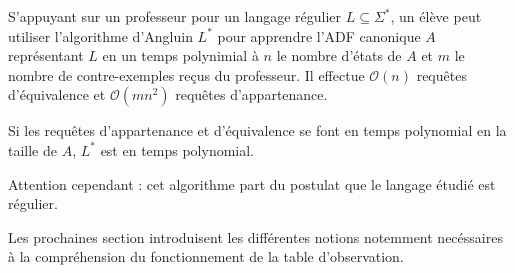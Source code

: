 \begin{theorem}
	S'appuyant sur un professeur pour un langage régulier $L\subseteq\Sigma^*$, un élève peut utiliser l'algorithme d'Angluin $L^*$ pour apprendre l'ADF canonique $A$ représentant $L$ en un temps polynimial à $n$ le nombre d'états de $A$ et $m$ le nombre de contre-exemples reçus du professeur.
	Il effectue $\mathcal{O}(n)$ requêtes d'équivalence et $\mathcal{O}(mn^2)$ requêtes d'appartenance.\cite{Angluin87}
\end{theorem}

\begin{corollary}
	Si les requêtes d'appartenance et d'équivalence se font en temps polynomial en la taille de $A$, $L^*$ est en temps polynomial.
\end{corollary}

Attention cependant : cet algorithme part du postulat que le langage étudié est régulier.

Les prochaines section introduisent les différentes notions notemment necéssaires à la compréhension du fonctionnement de la table d'observation.
